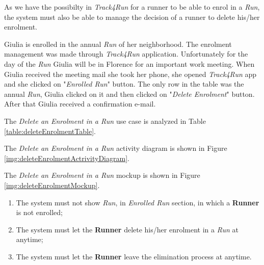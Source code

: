 As we have the possibilty in \textit{Track4Run} for a runner to be able to enrol in a \textit{Run}, the system must also be able to manage the decision of a runner to delete his/her enrolment.

Giulia is enrolled in the annual \textit{Run} of her neighborhood. The enrolment management was made through \textit{Track4Run} application. Unfortunately for the day of the \textit{Run} Giulia will be in Florence for an important work meeting.
When Giulia received the meeting mail she took her phone, she opened \textit{Track4Run} app and she clicked on "\textit{Enrolled Run}" button.
The only row in the table was the annual \textit{Run}, Giulia clicked on it and then clicked on "\textit{Delete Enrolment}" button.
After that Giulia received a confirmation e-mail.

The \textit{Delete an Enrolment in a Run} use case is analyzed in Table \ref{table:deleteEnrolmentTable}.

The \textit{Delete an Enrolment in a Run} activity diagram is shown in Figure \ref{img:deleteEnrolmentActrivityDiagram}.

The \textit{Delete an Enrolment in a Run} mockup is shown in Figure \ref{img:deleteEnrolmentMockup}.

\begin{enumerate}
  \item The system must not show \textit{Run}, in \textit{Enrolled Run} section, in which a \textbf{Runner} is not enrolled;
  \item The system must let the \textbf{Runner} delete his/her enrolment in a \textit{Run} at anytime;
  \item The system must let the \textbf{Runner} leave the elimination process at anytime.
\end{enumerate}

